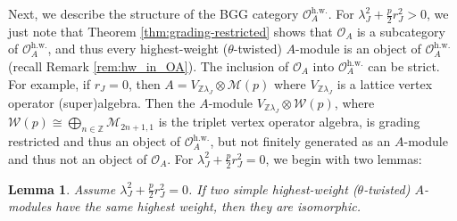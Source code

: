 \documentclass[11pt, reqno]{amsart}
\newtheorem{lem}[thm]{Lemma}
\theoremstyle{definition}\newtheorem{defi}[thm]{Definition}
\theoremstyle{definition}\newtheorem{rem}[thm]{Remark}
\theoremstyle{definition}\newtheorem{exam}[thm]{Example}
\theoremstyle{definition}\newtheorem{assum}[thm]{Assumption}
\newcommand{\cM}{\mathcal{M}}
\newcommand{\cO}{\mathcal{O}}
\newcommand{\cW}{\mathcal{W}}
\newcommand{\ZZ}{\mathbb{Z}}
\begin{document}
Next, we describe the structure of the BGG category $\cO_A^{\mathrm{h.w.}}$. For $\lambda_J^2+\frac{p}{2}r_J^2>0$, we just note that Theorem \ref{thm:grading-restricted} shows that $\cO_A$ is a subcategory of $\cO_A^{\mathrm{h.w.}}$, and thus every highest-weight ($\theta$-twisted) $A$-module is an object of $\cO_A^{\mathrm{h.w.}}$ (recall Remark \ref{rem:hw_in_OA}). The inclusion of $\cO_A$ into $\cO_A^{\mathrm{h.w.}}$ can be strict. For example, if $r_J=0$, then $A=V_{\ZZ\lambda_J}\otimes\cM(p)$ where $V_{\ZZ\lambda_J}$ is a lattice vertex operator (super)algebra. Then the $A$-module $V_{\ZZ\lambda_J}\otimes\cW(p)$, where $\cW(p)\cong\bigoplus_{n\in\ZZ} \cM_{2n+1,1}$ is the triplet vertex operator algebra, is grading restricted and thus an object of $\cO_A^{\mathrm{h.w.}}$, but not finitely generated as an $A$-module and thus not an object of $\cO_A$. For $\lambda_J^2+\frac{p}{2}r_J^2=0$, we begin with two lemmas:
\begin{lem}\label{lem:hw_unique}
Assume $\lambda_J^2+\frac{p}{2}r_J^2=0$. If two simple highest-weight ($\theta$-twisted) $A$-modules have the same highest weight, then they are isomorphic.
\end{lem}
\end{document}
